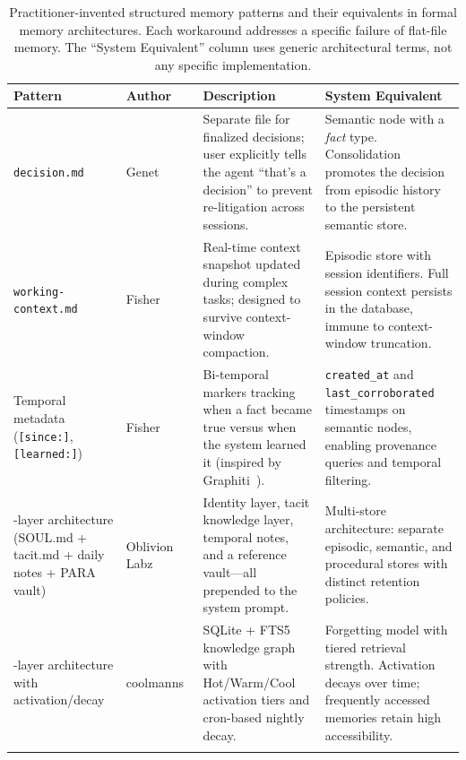 \begin{table}[!t]
\centering
\caption{Practitioner-invented structured memory patterns and their
equivalents in formal memory architectures.  Each workaround addresses a
specific failure of flat-file memory.  The ``System Equivalent'' column
uses generic architectural terms, not any specific implementation.}
\label{tab:structure-workarounds}
\small
\begin{tabular}{@{}L{3.4cm}L{2.5cm}L{3.7cm}L{3.8cm}@{}}
\toprule
\textbf{Pattern} & \textbf{Author} & \textbf{Description} & \textbf{System Equivalent} \\
\midrule
\texttt{decision.md}
  & Genet~\cite{genet2026}
  & Separate file for finalized decisions; user explicitly tells the
    agent ``that's a decision'' to prevent re-litigation across sessions.
  & Semantic node with a \emph{fact} type.  Consolidation promotes the
    decision from episodic history to the persistent semantic store. \\
\addlinespace
\texttt{working-context.md}
  & Fisher~\cite{fisher2026}
  & Real-time context snapshot updated during complex tasks; designed to
    survive context-window compaction.
  & Episodic store with session identifiers.  Full session context
    persists in the database, immune to context-window truncation. \\
\addlinespace
Temporal metadata (\texttt{[since:]}, \texttt{[learned:]})
  & Fisher~\cite{fisher2026}
  & Bi-temporal markers tracking when a fact became true versus when the
    system learned it (inspired by Graphiti~\cite{dempsey2025graphiti}).
  & \texttt{created\_at} and \texttt{last\_corroborated} timestamps on
    semantic nodes, enabling provenance queries and temporal filtering. \\
-layer architecture (SOUL.md + tacit.md + daily notes + PARA vault)
  & Oblivion Labz~\cite{oblivionlabz2025}
  & Identity layer, tacit knowledge layer, temporal notes, and a
    reference vault---all prepended to the system prompt.
  & Multi-store architecture: separate episodic, semantic, and
    procedural stores with distinct retention policies. \\
-layer architecture with activation/decay
  & coolmanns~\cite{coolmanns2026}
  & SQLite + FTS5 knowledge graph with Hot/Warm/Cool activation tiers
    and cron-based nightly decay.
  & Forgetting model with tiered retrieval strength.  Activation decays
    over time; frequently accessed memories retain high accessibility. \\
\addlinespace

\end{tabular}
\end{table}
